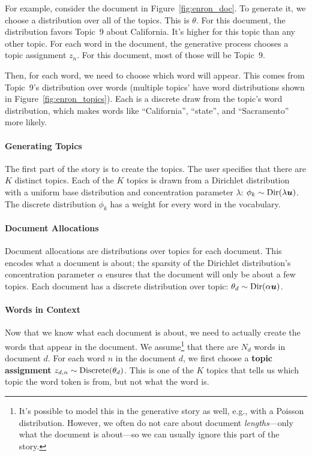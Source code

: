 For example, consider the document in Figure~\ref{fig:enron_doc}.  To
generate it, we choose a distribution over all of the topics.  This is
$\theta$.  For this document, the distribution favors Topic~9 about
California.  It's higher for this topic than any other topic.  For
each word in the document, the generative process chooses a topic
assignment $z_n$.  For this document, most of those will be Topic~9.

Then, for each word, we need to choose which word will appear.  This
comes from Topic~9's distribution over words (multiple topics' have
word distributions shown in Figure~\ref{fig:enron_topics}).  Each is a
discrete draw from the topic's word distribution, which makes words
like ``California'', ``state'', and ``Sacramento'' more likely.

\paragraph{Generating Topics}

The first part of the story is to create the topics.  The user specifies that
there are $K$ distinct topics.  Each of the $K$ topics is drawn from a Dirichlet
distribution with a uniform base distribution and concentration parameter
$\lambda$: $\phi_k \sim \mbox{Dir}(\lambda {\bm u})$.  The discrete distribution
$\phi_k$ has a weight for every word in the vocabulary.

\paragraph{Document Allocations}

Document allocations are distributions over topics for each document.  This
encodes what a document is about; the sparsity of the Dirichlet distribution's
concentration parameter $\alpha$ ensures that the document will only be about a
few topics.  Each document has a discrete distribution over topic: $\theta_d \sim
\mbox{Dir}(\alpha {\bm u})$.

\paragraph{Words in Context}

Now that we know what each document is about, we need to actually create the
words that appear in the document.  We assume\footnote{It's possible to model
  this in the generative story as well, e.g., with a Poisson distribution.
  However, we often do not care about document \emph{lengths}---only what the
  document is about---so we can usually ignore this part of the story.} that
there are $N_d$ words in document $d$.  For each word $n$ in the
document $d$, we first choose a {\bf topic assignment} $z_{d,n} \sim
\mbox{Discrete}( \theta_d)$.  This is one of the $K$ topics that tells us which topic the
word token is from, but not what the word is.

